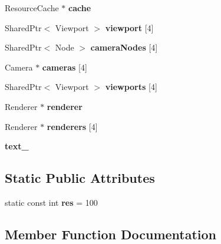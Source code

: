 \begin{DoxyCompactItemize}
Resource\+Cache $\ast$ {\bfseries cache}
\item 
\mbox{\label{class_my_app_a3d26a78927d8b27913bfc558f99facf1}} 
Shared\+Ptr$<$ Viewport $>$ {\bfseries viewport} \mbox{[}4\mbox{]}
\item 
\mbox{\label{class_my_app_a405bddcf6cc9ac979087e38eb7e87b3c}} 
Shared\+Ptr$<$ Node $>$ {\bfseries camera\+Nodes} \mbox{[}4\mbox{]}
\item 
\mbox{\label{class_my_app_a9cbef506648b453802b4dfcf03fb6ded}} 
Camera $\ast$ {\bfseries cameras} \mbox{[}4\mbox{]}
\item 
\mbox{\label{class_my_app_a134693deee2d35cf45302f5bb94f937a}} 
Shared\+Ptr$<$ Viewport $>$ {\bfseries viewports} \mbox{[}4\mbox{]}
\item 
\mbox{\label{class_my_app_a228f0e2d2e1dfcda35dbc36643c8f349}} 
Renderer $\ast$ {\bfseries renderer}
\item 
\mbox{\label{class_my_app_a1269269307da86f346e73e6611327ca3}} 
Renderer $\ast$ {\bfseries renderers} \mbox{[}4\mbox{]}
\item 
\mbox{\label{class_my_app_a5c8977c2b75d66e8c9f44ce4501833b0}} 
{\bfseries text\+\_\+}
\end{DoxyCompactItemize}
\subsection*{Static Public Attributes}
\begin{DoxyCompactItemize}
\item 
\mbox{\label{class_my_app_a4ad304edbe24cd4e8f601f00059df1d4}} 
static const int {\bfseries res} = 100
\end{DoxyCompactItemize}


\subsection{Member Function Documentation}
\mbox{\label{class_my_app_a009ad0629cfb490636e2cf876c1c99cd}} 

